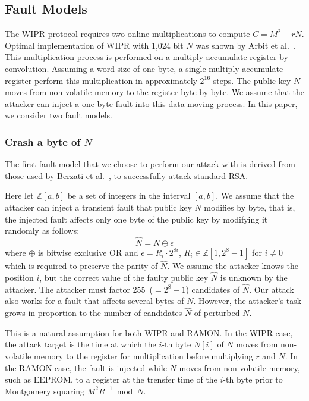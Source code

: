 \documentclass{article}
\begin{document}
\subsection{Fault Models}
The WIPR protocol requires two online multiplications to compute $C = M^2 + rN$. 
Optimal implementation of WIPR with 1,024 bit $N$ was shown by 
Arbit et al.~\cite{Implement}.
This multiplication process is performed on a multiply-accumulate register by convolution. 
Assuming a word size of one byte, a single multiply-accumulate register 
perform this multiplication in approximately $2^{16}$ steps. 
The public key $N$ moves from non-volatile memory to the register byte by byte. 
We assume that the attacker can inject a one-byte fault into this data moving process.
In this paper, we consider two fault models. 
\subsubsection{Crash a byte of $N$}
The first fault model that we choose to perform our attack 
with is derived from those used by Berzati et al.~\cite{Berzati2}, \cite{Berzati3} 
to successfully attack standard RSA.

Here let $\mathbb{Z}[a,b]$ be a set of integers in the interval $[a,b]$. 
We assume that the attacker can inject a transient fault that public key $N$ modifies by byte, that is,
the injected fault affects only one byte of the public key by modifying it randomly as follows:
$$
\hat{N} = N \oplus \epsilon
$$
where $\oplus$ is bitwise exclusive OR and $\epsilon = R_i\cdot 2^{8i}$, $R_i\in\mathbb{Z}[1,2^8-1]$ 
for $i\ne 0$ which 
is required to preserve the parity of $\hat{N}$. 
We assume the attacker knows the position $i$, 
but the correct value of the faulty public key $\hat{N}$ is unknown by the attacker.
The attacker must factor 255~($=2^8-1$) candidates of $\hat{N}$. 
Our attack also works for a fault that affects several bytes of $N$. 
However, the attacker's task grows in proportion to 
the number of candidates $\hat{N}$ of perturbed $N$.

This is a natural assumption for both WIPR and RAMON. 
In the WIPR case, the attack target is the time at 
which the $i$-th byte $N[i]$ of $N$ moves from non-volatile memory to 
the register for multiplication before multiplying $r$ and $N$. 
In the RAMON case, the fault is injected while $N$ moves from 
non-volatile memory, such as EEPROM, 
to a register at the trensfer time of the $i$-th byte 
prior to Montgomery squaring $M^2R^{-1}\bmod N$.
\end{document}
